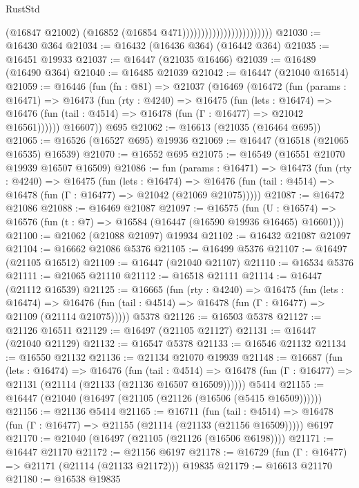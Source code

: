 \begin{lexlean}{RustStd}
\begin{coremodule}
{\begin{coremodule}
{{{{{{{{{{{{{{{{{{{{{{{{{{{{{{{{{{{{{{{{{{{{{{{{{{{{{{{                                                (@16847 @21002)
                                                (@16852 (@16854 @471))))))))))))))))))))))))
@21030 := @16430 @364
@21034 := @16432 (@16436 @364) (@16442 @364)
@21035 := @16451 @19933
@21037 := @16447 (@21035 @16466)
@21039 := @16489 (@16490 @364)
@21040 := @16485 @21039
@21042 := @16447 (@21040 @16514)
@21059 := @16446
    (fun (fn : @81) =>
    @21037
      (@16469
        (@16472
          (fun (params : @16471) =>
          @16473
            (fun (rty : @4240) =>
            @16475
              (fun (lets : @16474) =>
              @16476 (fun (tail : @4514) => @16478 (fun (Γ : @16477) => @21042 @16561))))))
        @16607))
    @695
@21062 := @16613 (@21035 (@16464 @695))
@21065 := @16526 (@16527 @695) @19936
@21069 := @16447 (@16518 (@21065 @16535) @16539)
@21070 := @16552 @695
@21075 := @16549 (@16551 @21070 @19939 @16507 @16509)
@21086 := fun (params : @16471) =>
  @16473
    (fun (rty : @4240) =>
    @16475
      (fun (lets : @16474) =>
      @16476 (fun (tail : @4514) => @16478 (fun (Γ : @16477) => @21042 (@21069 @21075)))))
@21087 := @16472 @21086
@21088 := @16469 @21087
@21097 := @16575
    (fun (U : @16574) => @16576 (fun (t : @7) => @16584 (@16447 (@16590 @19936 @16465) @16601)))
@21100 := @21062 (@21088 @21097) @19934
@21102 := @16432 @21087 @21097
@21104 := @16662 @21086 @5376
@21105 := @16499 @5376
@21107 := @16497 (@21105 @16512)
@21109 := @16447 (@21040 @21107)
@21110 := @16534 @5376
@21111 := @21065 @21110
@21112 := @16518 @21111
@21114 := @16447 (@21112 @16539)
@21125 := @16665
    (fun (rty : @4240) =>
    @16475
      (fun (lets : @16474) =>
      @16476 (fun (tail : @4514) => @16478 (fun (Γ : @16477) => @21109 (@21114 @21075)))))
    @5378
@21126 := @16503 @5378
@21127 := @21126 @16511
@21129 := @16497 (@21105 @21127)
@21131 := @16447 (@21040 @21129)
@21132 := @16547 @5378
@21133 := @16546 @21132
@21134 := @16550 @21132
@21136 := @21134 @21070 @19939
@21148 := @16687
    (fun (lets : @16474) =>
    @16476
      (fun (tail : @4514) =>
      @16478 (fun (Γ : @16477) => @21131 (@21114 (@21133 (@21136 @16507 @16509))))))
    @5414
@21155 := @16447 (@21040 (@16497 (@21105 (@21126 (@16506 (@5415 @16509))))))
@21156 := @21136 @5414
@21165 := @16711
    (fun (tail : @4514) => @16478 (fun (Γ : @16477) => @21155 (@21114 (@21133 (@21156 @16509)))))
    @6197
@21170 := @21040 (@16497 (@21105 (@21126 (@16506 @6198))))
@21171 := @16447 @21170
@21172 := @21156 @6197
@21178 := @16729 (fun (Γ : @16477) => @21171 (@21114 (@21133 @21172))) @19835
@21179 := @16613 @21170
@21180 := @16538 @19835
}}}}}}}}}}}}}}}}}}}}}}}}}}}}}}}}}}}}}}}}}}}}}}}}}}}}}}}
\end{coremodule}}
\end{coremodule}
\end{lexlean}
